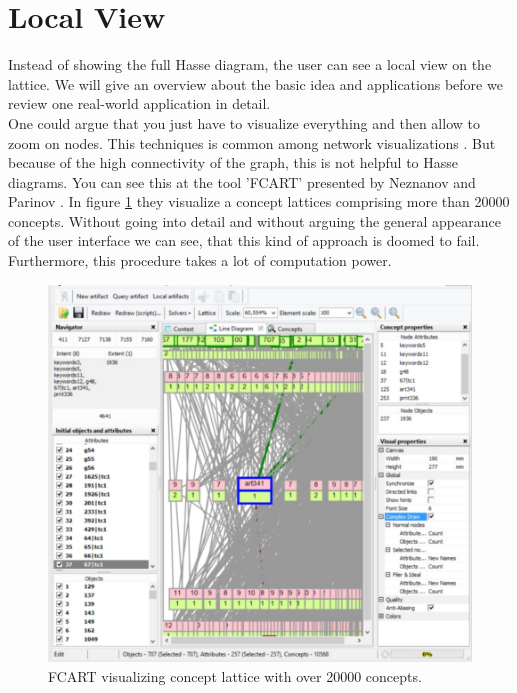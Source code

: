 \documentclass[11pt]{report}
\begin{document}
{{\section{Local View}
\label{Local View}

Instead of showing the full Hasse diagram, the user can see a local view on the lattice. We will give an overview about the basic idea and applications before we review one real-world application in detail. \\

One could argue that you just have to visualize everything and then allow to zoom on nodes. This techniques is common among network visualizations \cite{Herman2000}. But because of the high connectivity of the graph, this is not helpful to Hasse diagrams. You can see this at the tool 'FCART' presented by Neznanov and Parinov \cite{Neznanov2014}. In figure \ref{figure:fcart} they visualize a concept lattices comprising more than 20000 concepts. Without going into detail and without arguing the general appearance of the user interface we can see, that this kind of approach is doomed to fail. Furthermore, this procedure takes a lot of computation power. \\

\begin{figure}[!ht]
	\centering
	\includegraphics[width=\linewidth]{./images/fcart}
\caption{FCART visualizing concept lattice with over 20000 concepts.}
\label{figure:fcart}
\end{figure}

}}
\end{document}
